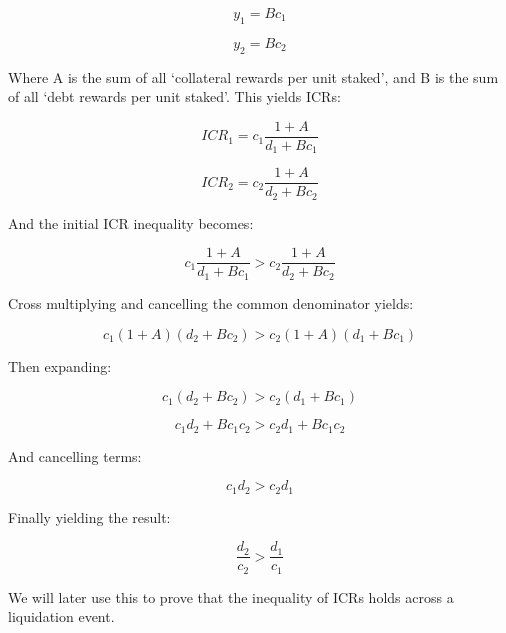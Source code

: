 \documentclass[reqno]{article}
\begin{document}
\begin{equation} 
    y_1=Bc_1
\end{equation}

\begin{equation} 
    y_2=Bc_2
\end{equation}

\bigskip
Where A is the sum of all ‘collateral rewards per unit staked’, and B is the sum of all ‘debt rewards per unit staked’. This yields ICRs:

\begin{equation} 
    ICR_1=c_1\frac{1+A}{d_1+Bc_1}
\end{equation}

\begin{equation} 
    ICR_2=c_2\frac{1+A}{d_2+Bc_2}
\end{equation}

And the initial ICR inequality becomes:

\begin{equation} 
    c_1\frac{1+A}{d_1+Bc_1}>c_2\frac{1+A}{d_2+Bc_2}
\end{equation}

\bigskip
Cross multiplying and cancelling the common denominator yields:

\begin{equation} 
    c_1\left(1+A\right)\left(d_2+Bc_2\right)>c_2\left(1+A\right)\left(d_1+Bc_1\right)
\end{equation}

Then expanding:

\begin{equation} 
    c_1\left(d_2+Bc_2\right)>c_2\left(d_1+Bc_1\right)
\end{equation}

\begin{equation} 
    c_1d_2+Bc_1c_2 > c_2d_1+Bc_1c_2
\end{equation}

\bigskip
And cancelling terms:

\begin{equation}
    c_1d_2 > c_2d_1
\end{equation}

\bigskip
Finally yielding the result:

\begin{equation} \label{eq:217}
    \frac{d_2}{c_2}>\frac{d_1}{c_1}
\end{equation}

\bigskip
We will later use this to prove that the inequality of ICRs holds across a liquidation event.\\
\end{document}
